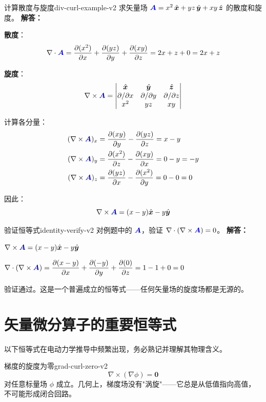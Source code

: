 \documentclass[11pt,a4paper,openany,oneside]{book}
\newcommand{\vecA}{\textcolor{blue!70!black}{\vect{A}}}
\newcommand{\vect}[1]{\bm{#1}}
\newcommand{\unitvec}[1]{\hat{\vect{#1}}}
\newcommand{\grad}{\nabla}
\newcommand{\curl}{\nabla\times}
\newcommand{\divg}{\nabla\cdot}
\newcommand{\difficulty}[1]{\marginnote{\textcolor{red}{\textbf{[#1]}}}}
\begin{document}
\begin{example}{计算散度与旋度}{div-curl-example-v2}
\difficulty{基础}
求矢量场 $\vecA = x^2 \,\unitvec{x} + yz \,\unitvec{y} + xy \,\unitvec{z}$ 的散度和旋度。
\tcblower
\textbf{解答：}

\textbf{散度}：
\[
\divg\vecA = \frac{\partial(x^2)}{\partial x} + \frac{\partial(yz)}{\partial y} + \frac{\partial(xy)}{\partial z} = 2x + z + 0 = 2x + z
\]

\textbf{旋度}：
\[
\curl\vecA = \begin{vmatrix}
\unitvec{x} & \unitvec{y} & \unitvec{z} \\
\partial/\partial x & \partial/\partial y & \partial/\partial z \\
x^2 & yz & xy
\end{vmatrix}
\]

计算各分量：
\begin{align*}
(\curl\vecA)_x &= \frac{\partial(xy)}{\partial y} - \frac{\partial(yz)}{\partial z} = x - y \\
(\curl\vecA)_y &= \frac{\partial(x^2)}{\partial z} - \frac{\partial(xy)}{\partial x} = 0 - y = -y \\
(\curl\vecA)_z &= \frac{\partial(yz)}{\partial x} - \frac{\partial(x^2)}{\partial y} = 0 - 0 = 0
\end{align*}

因此：
\[
\curl\vecA = (x-y)\unitvec{x} - y\unitvec{y}
\]
\end{example}

\begin{example}{验证恒等式}{identity-verify-v2}
\difficulty{提高}
对例题中的 $\vecA$，验证 $\divg(\curl\vecA) = 0$。
\tcblower
\textbf{解答：}

$\curl\vecA = (x-y)\unitvec{x} - y\unitvec{y}$

$\divg(\curl\vecA) = \dfrac{\partial(x-y)}{\partial x} + \dfrac{\partial(-y)}{\partial y} + \dfrac{\partial(0)}{\partial z} = 1 - 1 + 0 = 0$

验证通过。这是一个普遍成立的恒等式——任何矢量场的旋度场都是无源的。
\end{example}

\section{矢量微分算子的重要恒等式}

以下恒等式在电动力学推导中频繁出现，务必熟记并理解其物理含义。

\begin{theorem}{梯度的旋度为零}{grad-curl-zero-v2}
\[
\curl(\grad\phi) = \vect{0}
\]
对任意标量场 $\phi$ 成立。几何上，梯度场没有"涡旋"——它总是从低值指向高值，不可能形成闭合回路。
\end{theorem}
\end{document}
